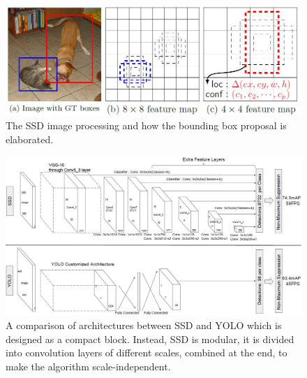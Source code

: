 \begin{figure}[!h]
	\centering
	\includegraphics[width=0.8\linewidth]{images/detection/howItWorks_ssd}
	\captionsetup{margin=0.5cm}
	\caption[The steps of the SSD algorithm.]{The SSD image processing and how the bounding box proposal is elaborated.}
	\label{fig:howItWorks_ssd}
\end{figure}
\begin{figure}[!h]
	\centering
	\includegraphics[width=1\linewidth]{images/detection/architecture_ssdVSyolo}
	\captionsetup{margin=0.5cm}
	\caption[Comparison of the architectures of SSD and YOLO.]{A comparison of architectures between SSD and YOLO which is designed as a compact block. Instead, SSD is modular, it is divided into convolution layers of different scales, combined at the end, to make the algorithm scale-independent.}
	\label{fig:architecture_ssdVSyolo}
\end{figure}


